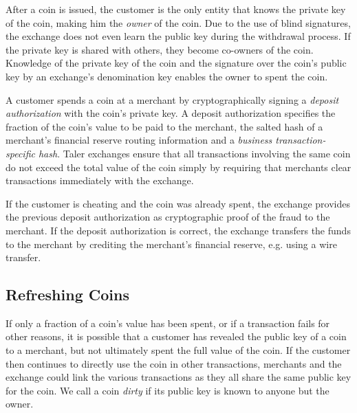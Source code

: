 \documentclass{llncs}
\begin{document}

After a coin is issued, the customer is the only entity that knows the
private key of the coin, making him the \emph{owner} of the coin.  Due
to the use of blind signatures, the exchange does not even learn the
public key during the withdrawal process.  If the private key is
shared with others, they become co-owners of the coin.  Knowledge of
the private key of the coin and the signature over the coin's public
key by an exchange's denomination key enables the owner to spent the
coin.



A customer spends a coin at a merchant by cryptographically signing a
{\em deposit authorization} with the coin's private key.  A deposit
authorization specifies the fraction of the coin's value to be paid to
the merchant, the salted hash of a merchant's financial reserve
routing information and a {\em business transaction-specific hash}.
Taler exchanges ensure that all transactions involving the same coin
do not exceed the total value of the coin simply by requiring that
merchants clear transactions immediately with the exchange.

If the customer is cheating and the coin was already spent, the
exchange provides the previous deposit authorization as cryptographic
proof of the fraud to the merchant.  If the deposit authorization is
correct, the exchange transfers the funds to the merchant by crediting
the merchant's financial reserve, e.g. using a wire transfer.


\subsection{Refreshing Coins}

If only a fraction of a coin's value has been spent, or if a
transaction fails for other reasons, it is possible that a customer
has revealed the public key of a coin to a merchant, but not
ultimately spent the full value of the coin.  If the customer then
continues to directly use the coin in other transactions, merchants
and the exchange could link the various transactions as they all share
the same public key for the coin.  We call a coin {\em dirty} if its
public key is known to anyone but the owner.
\end{document}
